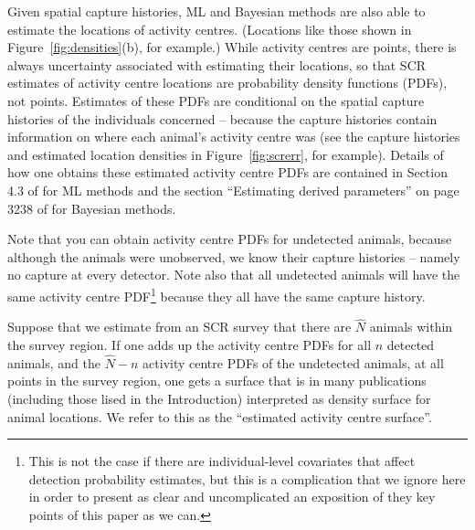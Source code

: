 \documentclass[10pt,a4paper]{article}
\begin{document}
Given spatial capture histories, ML and Bayesian methods are also able to estimate the locations of activity centres. (Locations like those shown in Figure~\ref{fig:densities}(b), for example.) While activity centres are points, there is always uncertainty associated with estimating their locations, so that SCR estimates of activity centre locations are probability density functions (PDFs), not points. Estimates of these PDFs are conditional on the spatial capture histories of the individuals concerned -- because the capture histories contain information on where each animal's activity centre was (see the capture histories and estimated location densities in Figure~\ref{fig:screrr}, for example). Details of how one obtains these estimated activity centre PDFs are contained in Section 4.3 of \cite{Borchers+Efford:08} for ML methods and the section ``Estimating derived parameters'' on page 3238 of \cite{Royle+al:09b} for Bayesian methods.

Note that you can obtain activity centre PDFs for undetected animals, because although the animals were unobserved, we know their capture histories -- namely no capture at every detector. Note also that all undetected animals will have the same activity centre PDF\footnote{This is not the case if there are individual-level covariates that affect detection probability estimates, but this is a complication that we ignore here in order to present as clear and uncomplicated an exposition of they key points of this paper as we can.} because they all have the same capture history. 

Suppose that we estimate from an SCR survey that there are $\hat{N}$ animals within the survey region. If one adds up the activity centre PDFs for all $n$ detected animals, and the $\hat{N}-n$ activity centre PDFs of the undetected animals, at all points in the survey region, one gets a surface that is in many publications (including those lised in the Introduction) interpreted as density surface for animal locations.  We refer to this as the ``estimated activity centre surface''.
\end{document}
